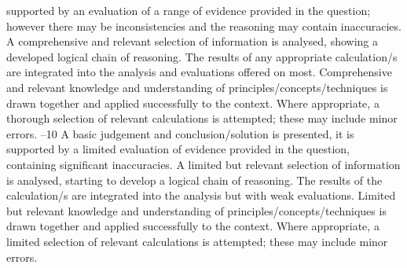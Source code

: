 \documentclass{article}
\begin{document}
supported by an evaluation of a range of evidence provided in the question; however \newline
there may be inconsistencies and the reasoning may contain inaccuracies. \newline
 \newline
A comprehensive and relevant selection of information is analysed, showing a \newline
developed logical chain of reasoning.  The results of any appropriate calculation/s \newline
are integrated into the analysis and evaluations offered on most.  \newline
 \newline
Comprehensive and relevant knowledge and understanding of \newline
principles/concepts/techniques is drawn together and applied successfully to the \newline
context.  Where appropriate, a thorough selection of relevant calculations is \newline
attempted; these may include minor errors.  –10 \newline
A basic judgement and conclusion/solution is presented, it is supported by a limited \newline
evaluation of evidence provided in the question, containing significant inaccuracies.  \newline
 \newline
A limited but relevant selection of information is analysed, starting to develop a \newline
logical chain of reasoning.  The results of the calculation/s are integrated into the \newline
analysis but with weak evaluations.  \newline
 \newline
Limited but relevant knowledge and understanding of principles/concepts/techniques \newline
is drawn together and applied successfully to the context.  Where appropriate, a \newline
limited selection of relevant calculations is attempted; these may include minor \newline
errors. \newline
 \newline
 \newline
 \newline
\end{document}
